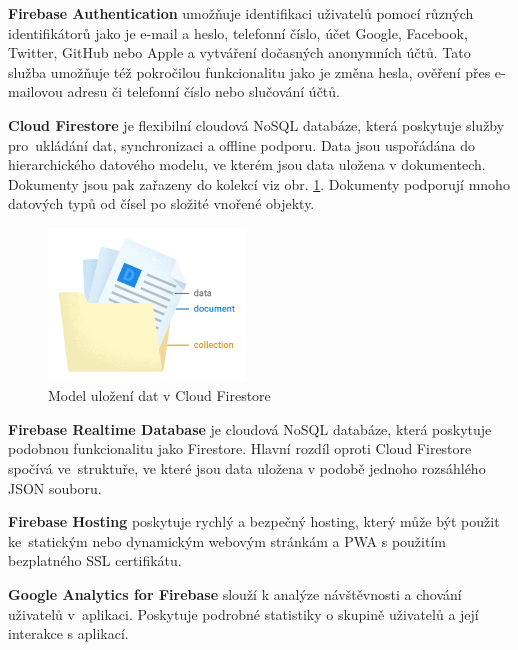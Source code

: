 \documentclass[czech, bc, kiv, he, iso690numb]{fasthesis}
\begin{document}
\noindent \textbf{Firebase Authentication} umožňuje identifikaci uživatelů pomocí různých identifikátorů jako je e-mail a heslo, telefonní číslo, účet Google, Facebook, Twitter, GitHub nebo Apple a vytváření dočasných anonymních účtů. Tato služba umožňuje též pokročilou funkcionalitu jako je změna hesla, ověření přes e-mailovou adresu či telefonní číslo nebo slučování účtů. 

\vspace{0.1cm}
\noindent \textbf{Cloud Firestore} je flexibilní cloudová \gls{NoSQL} databáze, která poskytuje služby pro~ukládání dat, synchronizaci a offline podporu. Data jsou uspořádána do hierarchického datového modelu, ve kterém jsou data uložena v dokumentech. Dokumenty jsou pak zařazeny do kolekcí viz obr. \ref{fig:firestore-data}. Dokumenty podporují mnoho datových typů od čísel po složité vnořené objekty.

\begin{figure}[h]
  \centering
  \includegraphics[width=0.47\textwidth]{img/BP-Runt/Data_storing/Firebase/structure-data-firestore.png}
  \caption{Model uložení dat v Cloud Firestore \cite{Firestore}}
  \label{fig:firestore-data}
\end{figure}


\vspace{0.1cm}
\noindent \textbf{Firebase Realtime Database} je cloudová \gls{NoSQL} databáze, která poskytuje podobnou funkcionalitu jako Firestore. Hlavní rozdíl oproti Cloud Firestore spočívá ve~struktuře, ve které jsou data uložena v podobě jednoho rozsáhlého \gls{JSON} souboru. 

\vspace{0.1cm}
\noindent \textbf{Firebase Hosting} poskytuje rychlý a bezpečný hosting, který může být použit ke~statickým nebo dynamickým webovým stránkám a \gls{PWA} s použitím bezplatného \gls{SSL} certifikátu. 

\vspace{0.1cm}
\noindent \textbf{Google Analytics for Firebase} slouží k analýze návštěvnosti a chování uživatelů v~aplikaci. Poskytuje podrobné statistiky o skupině uživatelů a její interakce s aplikací.
\end{document}
